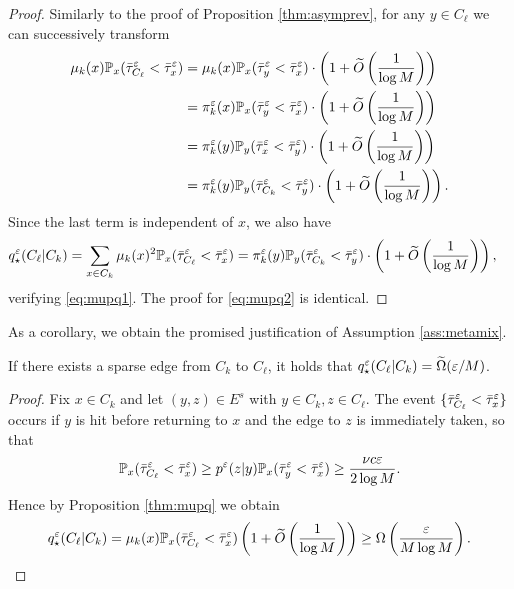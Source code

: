 \begin{proof}
Similarly to the proof of Proposition \ref{thm:asymprev}, for any $y\in C_\ell$ we can successively transform
\begin{align*}
\mu_k(x)\mathbb{P}_x(\bar{\tau}_{C_\ell}^\varepsilon < \bar{\tau}_x^\varepsilon) &= \mu_k(x)\mathbb{P}_x(\bar{\tau}_y^\varepsilon < \bar{\tau}_x^\varepsilon) \cdot \left(1+\widetilde{O}\left(\frac{1}{\log M}\right)\right)\\
&= \pi_k^\varepsilon(x)\mathbb{P}_x(\bar{\tau}_y^\varepsilon < \bar{\tau}_x^\varepsilon) \cdot \left(1+\widetilde{O}\left(\frac{1}{\log M}\right)\right) \\
&= \pi_k^\varepsilon(y)\mathbb{P}_y(\bar{\tau}_x^\varepsilon < \bar{\tau}_y^\varepsilon) \cdot \left(1+\widetilde{O}\left(\frac{1}{\log M}\right)\right) \\
&= \pi_k^\varepsilon(y)\mathbb{P}_y(\bar{\tau}_{C_k}^\varepsilon < \bar{\tau}_y^\varepsilon) \cdot \left(1+\widetilde{O}\left(\frac{1}{\log M}\right)\right).
\end{align*}
Since the last term is independent of $x$, we also have
\begin{align*}
q_\star^\varepsilon(C_\ell|C_k) &= \sum_{x\in C_k} \mu_k(x)^2 \mathbb{P}_x(\bar{\tau}_{C_\ell}^\varepsilon < \bar{\tau}_x^\varepsilon) = \pi_k^\varepsilon(y)\mathbb{P}_y(\bar{\tau}_{C_k}^\varepsilon < \bar{\tau}_y^\varepsilon) \cdot \left(1+\widetilde{O}\left(\frac{1}{\log M}\right)\right),
\end{align*}
verifying \eqref{eq:mupq1}. The proof for \eqref{eq:mupq2} is identical.
\end{proof}

As a corollary, we obtain the promised justification of Assumption \ref{ass:metamix}.

\begin{cor}\label{thm:qlower}
If there exists a sparse edge from $C_k$ to $C_\ell$, it holds that $q_\star^\varepsilon(C_\ell|C_k) = \widetilde{\Omega}(\varepsilon/M)$.
\end{cor}

\begin{proof}
Fix $x\in C_k$ and let $(y,z)\in E^s$ with $y\in C_k, z\in C_\ell$. The event $\{\bar{\tau}_{C_\ell}^\varepsilon < \bar{\tau}_x^\varepsilon\}$ occurs if $y$ is hit before returning to $x$ and the edge to $z$ is immediately taken, so that
\begin{align*}
\mathbb{P}_x(\bar{\tau}_{C_\ell}^\varepsilon < \bar{\tau}_x^\varepsilon) \ge p^\varepsilon(z|y) \mathbb{P}_x(\bar{\tau}_y^\varepsilon < \bar{\tau}_x^\varepsilon) \ge \frac{\nu c\varepsilon}{2\log M}.
\end{align*}
Hence by Proposition \ref{thm:mupq} we obtain
\begin{equation*}
q_\star^\varepsilon(C_\ell|C_k) = \mu_k(x)\mathbb{P}_x(\bar{\tau}_{C_\ell}^\varepsilon < \bar{\tau}_x^\varepsilon)\left(1+\widetilde{O}\left(\frac{1}{\log M}\right)\right) \ge \Omega\left(\frac{\varepsilon}{M\log M}\right).
\end{equation*}
\end{proof}


